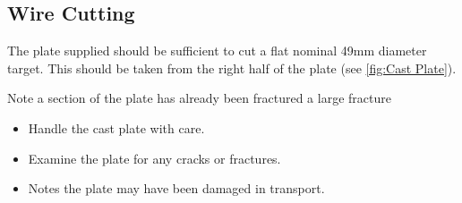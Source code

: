\subsection{Wire Cutting}
The plate supplied should be sufficient to cut a flat nominal 49mm diameter target. This should be taken from the right half of the plate (see \ref{fig:Cast Plate}).

Note a section of the plate has already been fractured a large fracture 
\begin{itemize}
\item Handle the cast plate with care. 
\item Examine the plate for any cracks or fractures. 
\item Notes the plate may have been damaged in transport. 
\end{itemize}